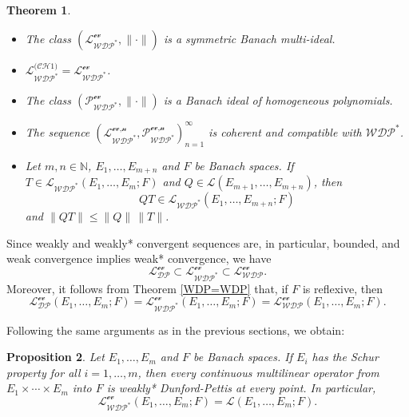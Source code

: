 \documentclass[12 pt]{article}%
\newtheorem{theorem}{Theorem}[section]
\newtheorem{proposition}[theorem]{Proposition}
\newtheorem{final remark}[theorem]{Final Remark}
\begin{document}
\begin{theorem}
	\begin{itemize}
		\item[(a)] The class $(\mathcal{L_{WDP^{*}}^{\text{ev}}}, \|\cdot\|)$ is a symmetric Banach multi-ideal.
		
		\item[(b)] $\mathcal{L_{WDP^{*}}^{\text{(CH1)}}} = \mathcal{L_{WDP^{*}}^{\text{ev}}}$.
		
		\item[(c)] The class $(\mathcal{P_{WDP^{*}}^{\text{ev}}}, \|\cdot\|)$ is a Banach ideal of homogeneous polynomials.
		
		\item[(d)] The sequence $(\mathcal{L_{WDP^{*}}^{\text{ev,n}}}, \mathcal{P_{WDP^{*}}^{\text{ev,n}}})_{n=1}^{\infty}$ is coherent and compatible with $\mathcal{WDP^{*}}$.
		
		\item[(e)] Let $m,n \in \mathbb{N}$, $E_1,\dots, E_{m+n}$ and $F$ be Banach spaces. If $T \in \mathcal{L_{WDP^{*}}}(E_1,\dots, E_m; F)$ and $Q \in \mathcal{L}(E_{m+1},\dots, E_{m+n})$, then
		\[
		QT \in \mathcal{L_{WDP^{*}}}(E_1,\dots, E_{m+n}; F)
		\]
		and $\|QT\| \le \|Q\|\,\|T\|$.
	\end{itemize}
\end{theorem}

Since weakly and weakly* convergent sequences are, in particular, bounded, and weak convergence implies weak* convergence, we have
\begin{equation*}
	\mathcal{L_{DP}^{\text{ev}}} \subset \mathcal{L_{WDP^{*}}^{\text{ev}}} \subset \mathcal{L_{WDP}^{\text{ev}}}.
\end{equation*}
Moreover, it follows from Theorem \ref{WDP=WDP} that, if $F$ is reflexive, then
\begin{equation*}
	\mathcal{L_{DP}^{\text{ev}}}(E_1,\dots, E_m; F)
	= \mathcal{L_{WDP^{*}}^{\text{ev}}}(E_1,\dots, E_m; F)
	= \mathcal{L_{WDP}^{\text{ev}}}(E_1,\dots, E_m; F).
\end{equation*}

Following the same arguments as in the previous sections, we obtain:

\begin{proposition}
	Let $E_1,\dots, E_m$ and $F$ be Banach spaces. If $E_i$ has the Schur property for all $i=1,\dots, m$, then every continuous multilinear operator from $E_1 \times \cdots \times E_m$ into $F$ is weakly* Dunford-Pettis at every point. In particular,
	\begin{equation*}
		\mathcal{L_{WDP^{*}}^{\text{ev}}}(E_1,\dots, E_m; F) = \mathcal{L}(E_1,\dots, E_m; F).
	\end{equation*}
\end{proposition}
\end{document}
